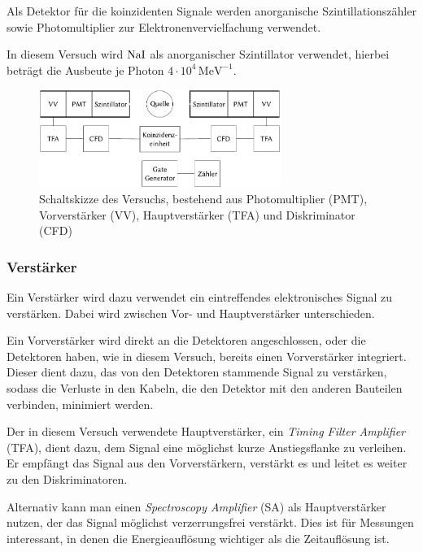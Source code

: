 \documentclass[12pt,a4paper]{scrartcl}
\numberwithin{equation}{section} %
\newcommand{\pu}[1]{\ensuremath{\mathrm{#1}}}
\begin{document}
Als Detektor für die koinzidenten Signale werden anorganische Szintillationszähler sowie Photomultiplier zur Elektronenvervielfachung verwendet.

In diesem Versuch wird $\ce{NaI}$ als anorganischer Szintillator verwendet, hierbei beträgt die Ausbeute je Photon $\pu{4\cdot 10^{4}\, MeV^{-1}}$.

\begin{figure}[h]
	\centering
	\includegraphics[width=0.7\textwidth]{../media/B3.4/Schaltplan.pdf}
	\caption{Schaltskizze des Versuchs, bestehend aus
		Photomultiplier (PMT), Vorverstärker (VV),
		Hauptverstärker (TFA) und Diskriminator (CFD) \cite{UzK}}
	\label{abb:Schaltplan}
\end{figure}


\hypertarget{verstuxe4rker}{%
\subsubsection{Verstärker}\label{verstuxe4rker}}

Ein Verstärker wird dazu verwendet ein eintreffendes elektronisches Signal zu verstärken. Dabei wird zwischen Vor- und Hauptverstärker unterschieden.

Ein Vorverstärker wird direkt an die Detektoren angeschlossen, oder die Detektoren haben, wie in diesem Versuch, bereits einen Vorverstärker integriert. Dieser dient dazu, das von den Detektoren stammende Signal
zu verstärken, sodass die Verluste in den Kabeln, die den Detektor mit den anderen Bauteilen verbinden, minimiert werden.

Der in diesem Versuch verwendete Hauptverstärker, ein \emph{Timing Filter Amplifier} (TFA), dient dazu, dem Signal eine möglichst kurze Anstiegsflanke zu verleihen. Er empfängt das Signal aus den Vorverstärkern, verstärkt es und leitet es weiter zu den Diskriminatoren.

Alternativ kann man einen \emph{Spectroscopy Amplifier} (SA) als Hauptverstärker nutzen, der das Signal möglichst verzerrungsfrei verstärkt. Dies ist für Messungen interessant, in denen die Energieauflösung wichtiger als die Zeitauflösung ist.
\end{document}
